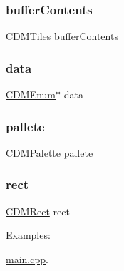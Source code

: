 \subsubsection{\texorpdfstring{buffer\+Contents}{bufferContents}}
{\footnotesize\ttfamily \mbox{\hyperlink{struct_c_d_m_tiles}{C\+D\+M\+Tiles}} buffer\+Contents}

\mbox{\label{struct_c_d_m_surface_adce19b3211f4678a93f6924f7888c7e9}} 
\subsubsection{\texorpdfstring{data}{data}}
{\footnotesize\ttfamily \mbox{\hyperlink{_c_d_m_8h_a3b61dfc1ca706f8e42c76483dc93576f}{C\+D\+M\+Enum}}$\ast$ data}

\mbox{\label{struct_c_d_m_surface_a22f86f11ee9943243675467949ec8505}} 
\subsubsection{\texorpdfstring{pallete}{pallete}}
{\footnotesize\ttfamily \mbox{\hyperlink{struct_c_d_m_palette}{C\+D\+M\+Palette}} pallete}

\mbox{\label{struct_c_d_m_surface_aa61e26c3b59930152cdaa0ce2dac8b14}} 
\subsubsection{\texorpdfstring{rect}{rect}}
{\footnotesize\ttfamily \mbox{\hyperlink{_c_d_m_8h_a23402dc2128c3c7f1e88e505a5631b9c}{C\+D\+M\+Rect}} rect}

\begin{Desc}
\item[Examples\+: ]\par
\mbox{\hyperlink{main_8cpp-example}{main.\+cpp}}.\end{Desc}
